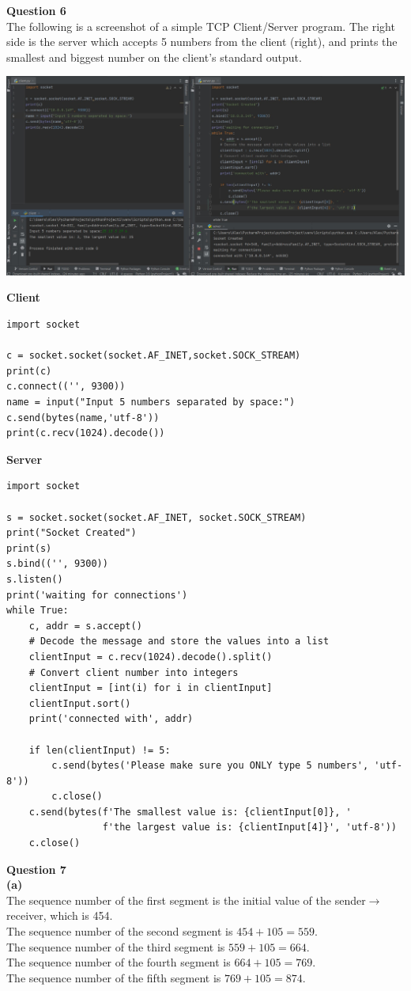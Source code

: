 \documentclass{article}
\begin{document}
\break
{\bf Question 6}\\
The following is a screenshot of a simple TCP Client/Server program. The right side is the server which accepts 5 numbers from the client (right), and prints the smallest and biggest number on the client's standard output.
\begin{center}
    \includegraphics[width=1\textwidth]{q6.jpg}
\end{center}

{\bf Client}
\begin{lstlisting}
import socket

c = socket.socket(socket.AF_INET,socket.SOCK_STREAM)
print(c)
c.connect(('', 9300))
name = input("Input 5 numbers separated by space:")
c.send(bytes(name,'utf-8'))
print(c.recv(1024).decode())
\end{lstlisting}

{\bf Server}
\begin{lstlisting}
import socket

s = socket.socket(socket.AF_INET, socket.SOCK_STREAM)
print("Socket Created")
print(s)
s.bind(('', 9300))
s.listen()
print('waiting for connections')
while True:
    c, addr = s.accept()
    # Decode the message and store the values into a list
    clientInput = c.recv(1024).decode().split()
    # Convert client number into integers
    clientInput = [int(i) for i in clientInput]
    clientInput.sort()
    print('connected with', addr)

    if len(clientInput) != 5:
        c.send(bytes('Please make sure you ONLY type 5 numbers', 'utf-8'))
        c.close()
    c.send(bytes(f'The smallest value is: {clientInput[0]}, '
                 f'the largest value is: {clientInput[4]}', 'utf-8'))
    c.close()

\end{lstlisting}

\bigskip
{\bf Question 7}\\
{\bf (a)}\\
The sequence number of the first segment is the initial value of the sender$\rightarrow$receiver, which is 454.\\
The sequence number of the second segment is $454+105=559$.\\
The sequence number of the third segment is $559+105=664$.\\
The sequence number of the fourth segment is $664+105=769$.\\
The sequence number of the fifth segment is $769+105=874$.
\end{document}
